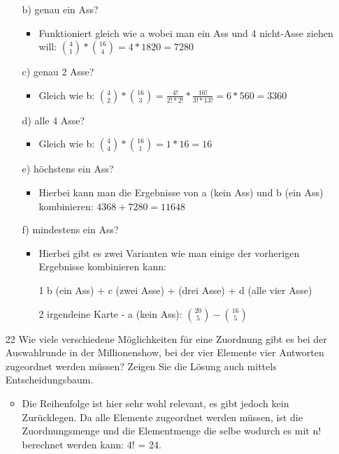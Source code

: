 \documentclass{article}
\begin{document}
\begin{itemize}
\begin{itemize}
\begin{itemize}
			\end{itemize}
			\item[b)]{genau ein Ass?}
			\begin{itemize}
				\item{Funktioniert gleich wie a wobei man ein Ass und 4 nicht-Asse ziehen will: $\binom{4}{1}*\binom{16}{4}=4*1820=7280$}
			\end{itemize}
			\item[c)]{genau 2 Asse?}
			\begin{itemize}
				\item{Gleich wie b: $\binom{4}{2}*\binom{16}{3}=\frac{4!}{2!*2!}*\frac{16!}{3!*13!}=6*560=3360$}
			\end{itemize}
			\item[d)]{alle 4 Asse?}
			\begin{itemize}
				\item{Gleich wie b: $\binom{4}{4}*\binom{16}{1}=1*16=16$}
			\end{itemize}
			\item[e)]{höchstens ein Ass?}
			\begin{itemize}
				\item{Hierbei kann man die Ergebnisse von a (kein Ass) und b (ein Ass) kombinieren: $4368+7280=11648$}
			\end{itemize}
			\item[f)]{mindestens ein Ass?}
			\begin{itemize}
				\item{Hierbei gibt es zwei Varianten wie man einige der vorherigen Ergebnisse kombinieren kann:}
				\item[1]{b (ein Ass) + c (zwei Asse) + (drei Asse) + d (alle vier Asse)}
				\item[2]{irgendeine Karte - a (kein Ass): $\binom{20}{5} - \binom{16}{5}$}
			\end{itemize}
		\end{itemize}
		\item[22]{Wie viele verschiedene Möglichkeiten für eine Zuordnung gibt es bei der Auswahlrunde in der Millionenshow, bei der vier Elemente vier Antworten zugeordnet werden müssen? Zeigen Sie die Lösung auch mittels Entscheidungsbaum.}
		\begin{itemize}
			\item{Die Reihenfolge ist hier sehr wohl relevant, es gibt jedoch kein Zurücklegen. Da alle Elemente zugeordnet werden müssen, ist die Zuordnungsmenge und die Elementmenge die selbe wodurch es mit n! berechnet werden kann: 4! = 24.}
		\end{itemize}
	\end{itemize}
\end{document}
